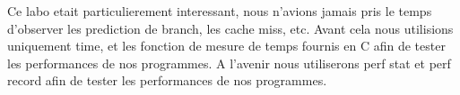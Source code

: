 \documentclass[
	a4paper, %
	10pt, %
]{CSUniSchoolLabReport}
\begin{document}
Ce labo etait particulierement interessant, nous n'avions jamais pris le temps d'observer les prediction de branch, les cache miss, etc.
Avant cela nous utilisions uniquement time, et les fonction de mesure de temps fournis en C afin de tester les performances de nos programmes.
A l'avenir nous utiliserons perf stat et perf record afin de tester les performances de nos programmes.



\printbibliography %

\end{document}
